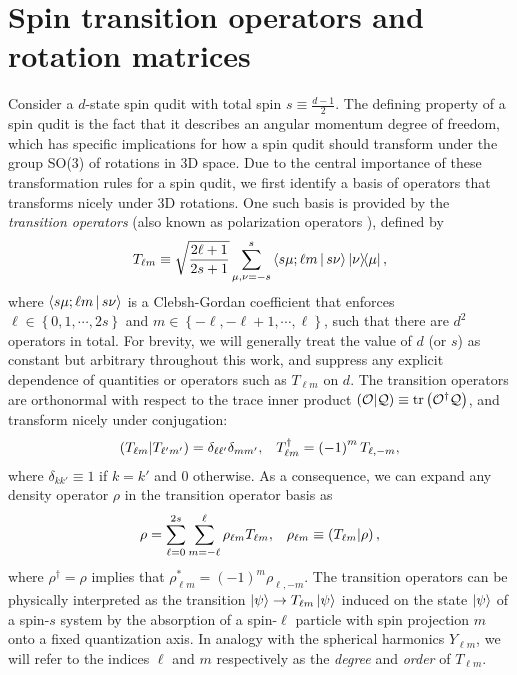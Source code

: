 \documentclass[nofootinbib,notitlepage,twocolumn]{revtex4-2}
\newcommand{\f}[2]{\dfrac{#1}{#2}} %
\newcommand{\p}[1]{\left(#1\right)} %
\renewcommand{\set}[1]{\left\{#1\right\}} %
\newcommand{\bk}{\Braket} %
\newcommand{\1}{\mathds{1}}
\renewcommand{\O}{\mathcal{O}}
\newcommand{\Q}{\mathcal{Q}}
\def\obk#1{\mathinner{({#1})}}
\begin{document}
\section{Spin transition operators and rotation matrices}

Consider a $d$-state spin qudit with total spin $s\equiv\frac{d-1}{2}$.
The defining property of a spin qudit is the fact that it describes an angular momentum degree of freedom, which has specific implications for how a spin qudit should transform under the group SO(3) of rotations in 3D space.
Due to the central importance of these transformation rules for a spin qudit, we first identify a basis of operators that transforms nicely under 3D rotations.
One such basis is provided by the {\it transition operators} (also known as polarization operators \cite{kryszewski2006positivity, bertlmann2008bloch}), defined by
\begin{align}
  T_{\ell m} \equiv \sqrt{\f{2\ell+1}{2s+1}} \sum_{\mu,\nu=-s}^s
  \bk{s\mu;\ell m|s\nu} \op{\nu}{\mu},
  \label{eq:trans_op}
\end{align}
where $\bk{s\mu;\ell m|s\nu}$ is a Clebsh-Gordan coefficient that enforces $\ell\in\set{0,1,\cdots,2s}$ and $m\in\set{-\ell,-\ell+1,\cdots,\ell}$, such that there are $d^2$ operators in total.
For brevity, we will generally treat the value of $d$ (or $s$) as constant but arbitrary throughout this work, and suppress any explicit dependence of quantities or operators such as $T_{\ell m}$ on $d$.
The transition operators are orthonormal with respect to the trace inner product $\obk{\O|\Q}\equiv\tr\p{\O^\dag\Q}$, and transform nicely under conjugation:
\begin{align}
  \obk{T_{\ell m }|T_{\ell'm'}}
  = \delta_{\ell\ell'} \delta_{mm'},
  &&
  T_{\ell m}^\dag = \p{-1}^m T_{\ell,-m},
\end{align}
where $\delta_{kk'}\equiv 1$ if $k=k'$ and $0$ otherwise.
As a consequence, we can expand any density operator $\rho$ in the transition operator basis as
\begin{align}
  \rho = \sum_{\ell=0}^{2s} \sum_{m=-\ell}^\ell \rho_{\ell m} T_{\ell m},
  &&
  \rho_{\ell m}\equiv\obk{T_{\ell m}|\rho},
  \label{eq:trans_state}
\end{align}
where $\rho^\dag=\rho$ implies that $\rho_{\ell m}^*=\p{-1}^m\rho_{\ell,-m}$.
The transition operators can be physically interpreted as the transition $\ket\psi\to T_{\ell m}\ket\psi$ induced on the state $\ket\psi$ of a spin-$s$ system by the absorption of a spin-$\ell$ particle with spin projection $m$ onto a fixed quantization axis.
In analogy with the spherical harmonics $Y_{\ell m}$, we will refer to the indices $\ell$ and $m$ respectively as the {\it degree} and {\it order} of $T_{\ell m}$.
\end{document}

